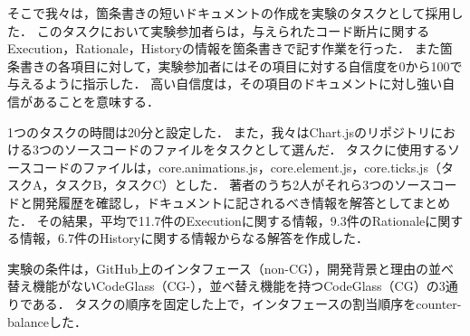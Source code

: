 そこで我々は，箇条書きの短いドキュメントの作成を実験のタスクとして採用した．
このタスクにおいて実験参加者らは，与えられたコード断片に関するExecution，Rationale，Historyの情報を箇条書きで記す作業を行った．
また箇条書きの各項目に対して，実験参加者にはその項目に対する自信度を0から100で与えるように指示した．
高い自信度は，その項目のドキュメントに対し強い自信があることを意味する．


1つのタスクの時間は20分と設定した．
また，我々はChart.jsのリポジトリにおける3つのソースコードのファイルをタスクとして選んだ．
タスクに使用するソースコードのファイルは，core.animations.js，core.element.js，core.ticks.js（タスクA，タスクB，タスクC）とした．
著者のうち2人がそれら3つのソースコードと開発履歴を確認し，ドキュメントに記されるべき情報を解答としてまとめた．
その結果，平均で11.7件のExecutionに関する情報，9.3件のRationaleに関する情報，6.7件のHistoryに関する情報からなる解答を作成した．



実験の条件は，GitHub上のインタフェース（non-CG），開発背景と理由の並べ替え機能がないCodeGlass（CG-），並べ替え機能を持つCodeGlass（CG）の3通りである．
タスクの順序を固定した上で，インタフェースの割当順序をcounter-balanceした．


